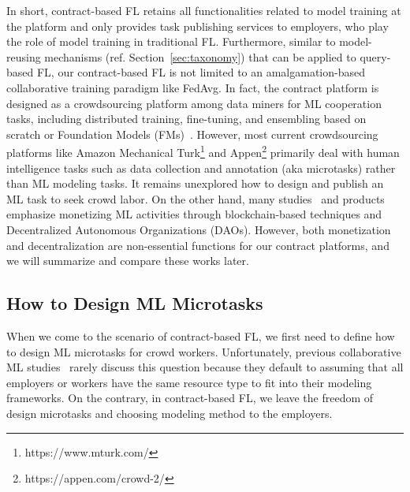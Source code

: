 In short, contract-based FL retains all functionalities related to model training at the platform and only provides task publishing services to employers, who play the role of model training in traditional FL.
Furthermore, similar to model-reusing mechanisms (ref. Section~\ref{sec:taxonomy}) that can be applied to query-based FL, our contract-based FL is not limited to an amalgamation-based collaborative training paradigm like FedAvg.
In fact, the contract platform is designed as a crowdsourcing platform among data miners for ML cooperation tasks, including distributed training, fine-tuning, and ensembling based on scratch or Foundation Models (FMs)~\cite{yuan2022decentralized}.
However, most current crowdsourcing platforms like Amazon Mechanical Turk\footnote{https://www.mturk.com/} and Appen\footnote{https://appen.com/crowd-2/} primarily deal with human intelligence tasks such as data collection and annotation (aka microtasks) rather than ML modeling tasks. 
It remains unexplored how to design and publish an ML task to seek crowd labor.
On the other hand, many studies~\cite{dias2022blocklearning, blythman2022decentralized, deng2021flex, guo2023blockchain, batool2022fl} and products~\cite{steeves2022incentivizing, ziller2021pysyft, mcconaghy2022ocean} emphasize monetizing ML activities through blockchain-based techniques and Decentralized Autonomous Organizations (DAOs). 
However, both monetization and decentralization are non-essential functions for our contract platforms, and we will summarize and compare these works later.


\subsection{How to Design ML Microtasks}

When we come to the scenario of contract-based FL, we first need to define how to design ML microtasks for crowd workers. 
Unfortunately, previous collaborative ML studies~\cite{li2021survey, nguyen2021federated} rarely discuss this question because they default to assuming that all employers or workers have the same resource type to fit into their modeling frameworks.
On the contrary, in contract-based FL, we leave the freedom of design microtasks and choosing modeling method to the employers.

